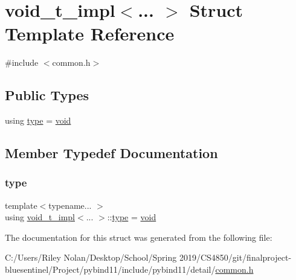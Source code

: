 \hypertarget{structvoid__t__impl}{}\section{void\+\_\+t\+\_\+impl$<$... $>$ Struct Template Reference}
\label{structvoid__t__impl}


{\ttfamily \#include $<$common.\+h$>$}

\subsection*{Public Types}
\begin{DoxyCompactItemize}
\item 
using \mbox{\hyperlink{structvoid__t__impl_a90240510fc2b3785df49dec99bbe43e2}{type}} = \mbox{\hyperlink{_s_d_l__opengles2__gl2ext_8h_ae5d8fa23ad07c48bb609509eae494c95}{void}}
\end{DoxyCompactItemize}


\subsection{Member Typedef Documentation}
\mbox{\label{structvoid__t__impl_a90240510fc2b3785df49dec99bbe43e2}} 
\subsubsection{\texorpdfstring{type}{type}}
{\footnotesize\ttfamily template$<$typename... $>$ \\
using \mbox{\hyperlink{structvoid__t__impl}{void\+\_\+t\+\_\+impl}}$<$... $>$\+::\mbox{\hyperlink{structvoid__t__impl_a90240510fc2b3785df49dec99bbe43e2}{type}} =  \mbox{\hyperlink{_s_d_l__opengles2__gl2ext_8h_ae5d8fa23ad07c48bb609509eae494c95}{void}}}



The documentation for this struct was generated from the following file\+:\begin{DoxyCompactItemize}
\item 
C\+:/\+Users/\+Riley Nolan/\+Desktop/\+School/\+Spring 2019/\+C\+S4850/git/finalproject-\/bluesentinel/\+Project/pybind11/include/pybind11/detail/\mbox{\hyperlink{detail_2common_8h}{common.\+h}}\end{DoxyCompactItemize}
